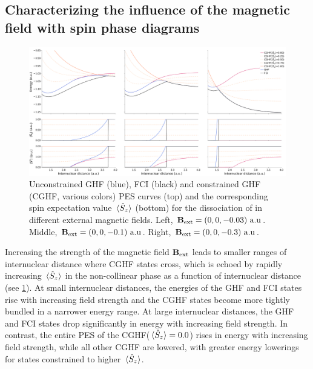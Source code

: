 \documentclass[journal=jctc,manuscript=article]{achemso}
\begin{document}
    \subsection{Characterizing the influence of the magnetic field with spin phase diagrams}
        
        \begin{figure}
            \centering
            \includegraphics[width=\textwidth]{C-GHF-PES(H2)-S2}
            \caption{
                Unconstrained GHF (blue), FCI (black) and constrained GHF (CGHF, various colors) PES curves (top) and the corresponding spin expectation value $\ev*{\hat{S}_z}$ (bottom) for the dissociation of  in different external magnetic fields.
                Left, $\vb{B}_{\text{ext}} = (0,0,-0.03)\text{ a.u}$.
                Middle, $\vb{B}_{\text{ext}} = (0,0,-0.1)\text{ a.u}$.
                Right, $\vb{B}_{\text{ext}} = (0,0,-0.3)\text{ a.u}$.
            }
            \label{fig:C-GHF-PES(H2)}
        \end{figure}
        
        Increasing the strength of the magnetic field $\vb{B}_{\text{ext}}$ leads to smaller ranges of internuclear distance where CGHF states cross, which is echoed by rapidly increasing $\ev*{\hat{S}_z}$ in the non-collinear phase as a function of internuclear distance (see \cref{fig:C-GHF-PES(H2)}).
        At small internuclear distances, the energies of the GHF and FCI states rise with increasing field strength and the CGHF states become more tightly bundled in a narrower energy range.
        At large internuclear distances, the GHF and FCI states drop significantly in energy with increasing field strength. 
        In contrast, the entire PES of the CGHF($\ev*{\hat{S}_z}=0.0$) rises in energy with increasing field strength, while all other CGHF are lowered, with greater energy lowerings for states constrained to higher $\ev*{\hat{S}_z}$.
        
\end{document}
